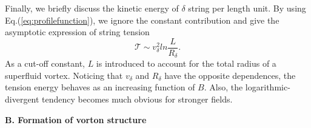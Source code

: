 \documentclass[prd, showpacs,nofootinbib,amsmath,amssymb]{revtex4}
\begin{document}
Finally, we briefly discuss the kinetic energy of $\delta$ string per length unit. 
By using Eq.(\ref{eq:profilefunction}), we ignore the constant
contribution and give the asymptotic expression of string tension 
\begin{equation}
  \label{eq:tension1}
  \mathcal{T} \sim v_\delta^2 ln\frac{L}{R_\delta}.
\end{equation}
As a cut-off constant, $L$ is introduced to account for the total radius of a superfluid vortex. 
Noticing that $v_\delta$ and $R_\delta$ have the opposite dependences, the tension energy behaves as an increasing function of $B$.
Also, the logarithmic-divergent tendency becomes much obvious for stronger fields.


\vspace{0.2cm}
\textbf{B. Formation of vorton structure }
\vspace{0.2cm}
\end{document}
